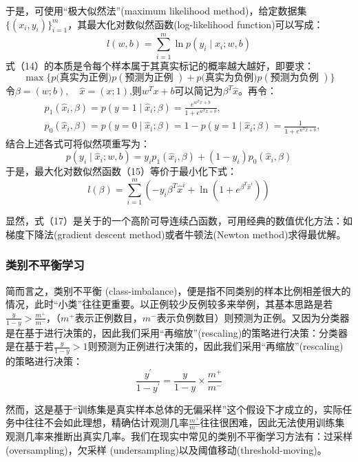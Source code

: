 于是，可使用“极大似然法”(maximum likelihood method)，给定数据集$\{(x_i,y_i)\}_{i=1}^m$，其最大化对数似然函数(log-likelihood function)可以写成：
\begin{equation}l(w,b)=\sum_{i=1}^m\ln p(y_i\mid x_i;w,b)\end{equation}
式（14）的本质是令每个样本属于其真实标记的概率越大越好，即要求：
\begin{equation}\max\{p(\text{真实为正例)}p(\text{预测为正例 })+p(\text{真实为负例)}p(\text{预测为负例 })\}\end{equation}
令$\beta=(w;b),\quad\hat{x}=(x;1)$,则$w^Tx+b$可以简记为$\beta^T\hat{x}$。再令：
\begin{equation}\begin{aligned}&p_1(\hat{x}_i,\beta)=p(y=1\mid\hat{x}_i;\beta)=\frac{e^{w^Tx+b}}{1+e^{w^Tx+b}},\\&p_0(\hat{x}_i,\beta)=p(y=0\mid\hat{x}_i;\beta)=1-p(y=1\mid\hat{x}_i;\beta)=\frac1{1+e^{w^Tx+b}},\end{aligned}\end{equation}
结合上述各式可将似然项重写为：
\begin{equation}p(y_i\mid\hat{x}_i;w,b)=y_ip_1(\hat{x}_i,\beta)+(1-y_i)p_0(\hat{x}_i,\beta)\end{equation}
于是，最大化对数似然函数（15）等价于最小化下式：
\begin{equation}l(\beta)=\sum_{i=1}^m(-y_i\beta^T\hat{x}^i+\ln(1+e^{\beta^T\hat{x}^i}))\end{equation}

显然，式（17）是关于的一个高阶可导连续凸函数，可用经典的数值优化方法：如梯度下降法(gradient descent method)或者牛顿法(Newton method)求得最优解。
\subsubsection{类别不平衡学习}
简而言之，类别不平衡 (class-imbalance)，便是指不同类别的样本比例相差很大的情况，此时“小类”往往更重要。以正例较少反例较多来举例，其基本思路是若$\frac y{1-y}>\frac{m^+}{m^-}$，（${m^+}$表示正例数目，${m^-}$表示负例数目）则预测为正例。又因为分类器是在基于进行决策的，因此我们采用“再缩放”(rescaling)的策略进行决策：分类器是在基于若$\frac y{1-y}>1$则预测为正例进行决策的，因此我们采用“再缩放”(rescaling)的策略进行决策：
\begin{equation}\frac{y^{\prime}}{1-y^{\prime}}=\frac y{1-y}\times\frac{m^+}{m^-}\end{equation}

然而，这是基于“训练集是真实样本总体的无偏采样”这个假设下才成立的，实际任务中往往不会如此理想，精确估计观测几率$\frac{m^+}{m^-}$往往很困难，因此无法使用训练集观测几率来推断出真实几率。我们在现实中常见的类别不平衡学习方法有：过采样 (oversampling)，欠采样 (undersampling)以及阈值移动(threshold-moving)。

